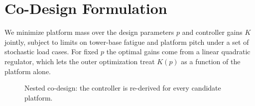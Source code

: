 \chapter{Co-Design Formulation}
\label{ch:method}

We minimize platform mass over the design parameters $p$ and controller gains $K$ jointly,
subject to limits on tower-base fatigue and platform pitch under a set of stochastic load
cases. For fixed $p$ the optimal gains come from a linear quadratic regulator, which lets the
outer optimization treat $K(p)$ as a function of the platform alone.

\begin{figure}[htbp]
  \centering
  \caption{Nested co-design: the controller is re-derived for every candidate platform.}
  \label{fig:nested}
\end{figure}
